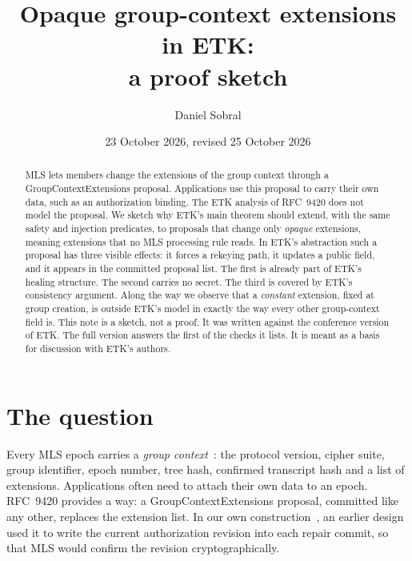 \documentclass[aps,prx,reprint,superscriptaddress,nofootinbib,floatfix]{revtex4-2}
\theoremstyle{remark}
\begin{document}
\title{Opaque group-context extensions in ETK:\\ a proof sketch}

\author{Daniel Sobral}

\date{23 October 2026, revised 25 October 2026}

\begin{abstract}
MLS lets members change the extensions of the group context through a GroupContextExtensions proposal. Applications use this proposal to carry their own data, such as an authorization binding. The ETK analysis of RFC~9420 does not model the proposal. We sketch why ETK's main theorem should extend, with the same safety and injection predicates, to proposals that change only \emph{opaque} extensions, meaning extensions that no MLS processing rule reads. In ETK's abstraction such a proposal has three visible effects: it forces a rekeying path, it updates a public field, and it appears in the committed proposal list. The first is already part of ETK's healing structure. The second carries no secret. The third is covered by ETK's consistency argument. Along the way we observe that a \emph{constant} extension, fixed at group creation, is outside ETK's model in exactly the way every other group-context field is. This note is a sketch, not a proof. It was written against the conference version of ETK. The full version answers the first of the checks it lists. It is meant as a basis for discussion with ETK's authors.
\end{abstract}

\maketitle

\section{The question}

Every MLS epoch carries a \emph{group context}~\cite{rfc9420}: the protocol version, cipher suite, group identifier, epoch number, tree hash, confirmed transcript hash and a list of extensions. Applications often need to attach their own data to an epoch. RFC~9420 provides a way: a GroupContextExtensions proposal, committed like any other, replaces the extension list. In our own construction~\cite{concordance}, an earlier design used it to write the current authorization revision into each repair commit, so that MLS would confirm the revision cryptographically.
\end{document}
